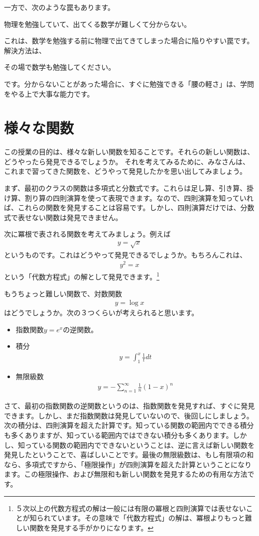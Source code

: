 \documentclass[report,paper=a4, fontsize=12pt, line_length=16cm, number_of_lines=33,dvipdfmx]{jlreq}
\newenvironment{myquote}{\begin{tcolorbox}[
  colback = blue!5, after = \noindent] }{\end{tcolorbox}}
\numberwithin{equation}{section}
\begin{document}
一方で、次のような罠もあります。
\begin{myquote}
  物理を勉強していて、出てくる数学が難しくて分からない。
\end{myquote}
これは、数学を勉強する前に物理で出てきてしまった場合に陥りやすい罠です。解決方法は、
\begin{myquote}
  その場で数学も勉強してください。
\end{myquote}
です。分からないことがあった場合に、すぐに勉強できる「腰の軽さ」は、学問をやる上で大事な能力です。

\section{様々な関数}
この授業の目的は、様々な新しい関数を知ることです。それらの新しい関数は、どうやったら発見できるでしょうか。
それを考えてみるために、みなさんは、これまで習ってきた関数を、どうやって発見したかを思い出してみましょう。

まず、最初のクラスの関数は多項式と分数式です。これらは足し算、引き算、掛け算、割り算の四則演算を使って表現できます。なので、四則演算を知っていれば、これらの関数を発見することは容易です。しかし、四則演算だけでは、分数式で表せない関数は発見できません。

次に冪根で表される関数を考えてみましょう。例えば
\begin{align}
  y=\sqrt{x}
\end{align}
というものです。これはどうやって発見できるでしょうか。もちろんこれは、
\begin{align}
  y^2=x
\end{align}
という「代数方程式」の解として発見できます。\footnote{５次以上の代数方程式の解は一般には有限の冪根と四則演算では表せないことが知られています。その意味で「代数方程式」の解は、冪根よりもっと難しい関数を発見する手がかりになります。}

もうちょっと難しい関数で、対数関数
\begin{align}
  y=\log x
\end{align}
はどうでしょうか。次の３つくらいが考えられると思います。
\begin{itemize}
  \item 指数関数$y=e^x$の逆関数。
  \item 積分
  \begin{align}
    y=\int_{1}^{x}\frac{1}{t} dt
  \end{align}
  \item 無限級数
  \begin{align}
    y=-\sum_{n=1}^{\infty}\frac{1}{n}(1-x)^n
  \end{align}
\end{itemize}
さて、最初の指数関数の逆関数というのは、指数関数を発見すれば、すぐに発見できます。しかし、まだ指数関数は発見していないので、後回しにしましょう。次の積分は、四則演算を超えた計算です。知っている関数の範囲内でできる積分も多くありますが、知っている範囲内ではできない積分も多くあります。しかし、知っている関数の範囲内でできないということは、逆に言えば新しい関数を発見したということで、喜ばしいことです。最後の無限級数は、もし有限項の和なら、多項式ですから、「極限操作」が四則演算を超えた計算ということになります。この極限操作、および無限和も新しい関数を発見するための有用な方法です。
\end{document}
